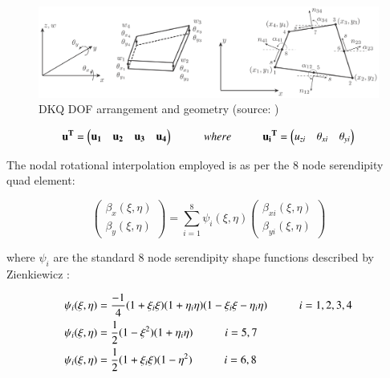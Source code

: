 \begin{figure}[H]
	\centering
	\def\svgwidth{\columnwidth}
	\includegraphics[width=15cm]{images/8nodeseren.png}
	\caption{DKQ DOF arrangement and geometry (source: \cite{Bar12})}
	\label{8nodeseren}
\end{figure}

\begin{equation} 
\mathbf{u^T} = 
\begin{pmatrix}
\mathbf{u_1} & \mathbf{u_2} & \mathbf{u_3} & \mathbf{u_4}
\end{pmatrix} 
\hspace{10mm}
where
\hspace{10mm}
\mathbf{u{_i}^T} = 
\begin{pmatrix}
{u_{zi}} & {\theta_{xi}} & {\theta_{yi}}
\end{pmatrix}
\label{equationBending}
\end{equation}

The nodal rotational interpolation employed is as per the 8 node serendipity quad element:

\begin{equation} 
\begin{pmatrix}
\beta_x (\xi , \eta) \\
\beta_y (\xi , \eta)
\end{pmatrix}
= \sum_{i=1}^8 \psi_i (\xi , \eta) 
\begin{pmatrix}
\beta_{xi} (\xi , \eta) \\
\beta_{yi} (\xi , \eta)
\end{pmatrix}
\label{equation20}
\end{equation}

where $\psi_i$ are the standard 8 node serendipity shape functions described by Zienkiewicz \cite{Zie77}:

\begin{gather} 
	\begin{aligned}
		&\psi_i (\xi , \eta) = \frac{-1}{4} (1 + \xi_i \xi)(1 + \eta_i \eta)(1 - \xi_i \xi - \eta_i \eta)
		\hspace{10mm}
		i = 1, 2, 3, 4 \\
		&\psi_i (\xi , \eta) = \frac{1}{2} (1 - \xi^2)(1 + \eta_i \eta)
		\hspace{10mm}
		i = 5, 7 \\
		&\psi_i (\xi , \eta) = \frac{1}{2} (1 + \xi_i \xi)(1 - \eta^2)
		\hspace{10mm}
		i = 6, 8
		\label{equation21}
	\end{aligned}
\end{gather}

